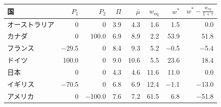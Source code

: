 \begin{tabular}{lrrrrrrr}
\toprule
国 & $P_{1}$ & $P_{2}$ & $\Pi$ & $\bar\mu$ & $w_{\mathrm{eq}}$ & $w^*$ & $w^* - \frac{w_{\mathrm{eq}}}{1+\tau}$ \\
\midrule
オーストラリア & 0 & 0 & 3.9 & 4.3 & 1.6 & 1.5 & 0.0 \\
カナダ & 0 & 100.0 & 6.9 & 8.9 & 2.2 & 53.9 & 51.8 \\
フランス & \ensuremath{-}29.5 & 0 & 8.4 & 9.3 & 5.2 & \ensuremath{-}0.5 & \ensuremath{-}5.4 \\
ドイツ & 100.0 & 0 & 9.0 & 10.6 & 5.5 & 23.6 & 18.4 \\
日本 & 0 & 0 & 4.3 & 4.6 & 11.6 & 11.0 & 0.0 \\
イギリス & \ensuremath{-}70.5 & 0 & 6.8 & 6.9 & 12.4 & \ensuremath{-}1.1 & \ensuremath{-}13.0 \\
アメリカ & 0 & \ensuremath{-}100.0 & 7.6 & 7.2 & 61.5 & 6.8 & \ensuremath{-}51.8 \\
\bottomrule
\end{tabular}
